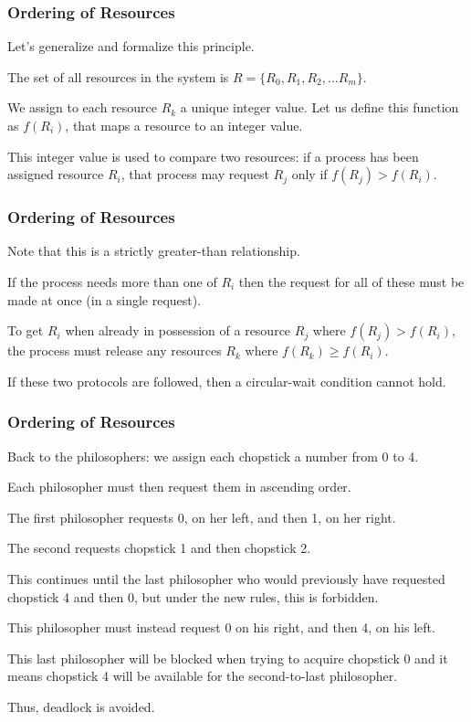 \begin{frame}
	\frametitle{Ordering of Resources}

	Let's generalize and formalize this principle.

	The set of all resources in the system is $R = \{R_{0}, R_{1}, R_{2}, ... R_{m}\}$.

	We assign to each resource $R_{k}$ a unique integer value. Let us define this function as $f(R_{i})$, that maps a resource to an integer value.

	This integer value is used to compare two resources: if a process has been assigned resource $R_{i}$, that process may request $R_{j}$ only if $f(R_{j}) > f(R_{i})$.


\end{frame}

\begin{frame}
	\frametitle{Ordering of Resources}

	Note that this is a strictly greater-than relationship.

	If the process needs more than one of $R_{i}$ then the request for all of these must be made at once (in a single request).

	To get $R_{i}$ when already in possession of a resource $R_{j}$ where $f(R_{j}) > f(R_{i})$, the process must release any resources $R_{k}$ where $f(R_{k}) \geq f(R_{i})$.

	If these two protocols are followed, then a circular-wait condition cannot hold.

\end{frame}

\begin{frame}
	\frametitle{Ordering of Resources}

	Back to the philosophers: we assign each chopstick a number from 0 to 4.

	Each philosopher must then request them in ascending order.

	The first philosopher requests 0, on her left, and then 1, on her right.

	The second requests chopstick 1 and then chopstick 2.

	This continues until the last philosopher who would previously have requested chopstick 4 and then 0, but under the new rules, this is forbidden.

	This philosopher must instead request 0 on his right, and then 4, on his left.

	This last philosopher will be blocked when trying to acquire chopstick 0 and it means chopstick 4 will be available for the second-to-last philosopher.

	Thus, deadlock is avoided.

\end{frame}

